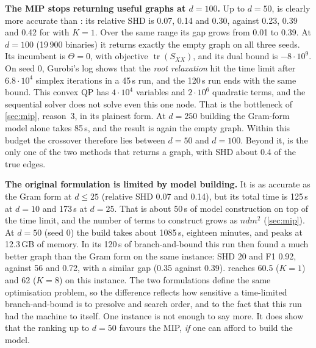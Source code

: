 \textbf{The MIP stops returning useful graphs at $d=100$.} Up to $d=50$, \exdbn{} is clearly
more accurate than \feddbn: its relative SHD is 0.07, 0.14 and 0.30, against 0.23, 0.39 and
0.42 for \feddbn{} with $K=1$. Over the same range its gap grows from 0.01 to 0.39. At
$d=100$ (19\,900 binaries) it returns exactly the empty graph on all three seeds. Its
incumbent is $\Theta=0$, with objective $\operatorname{tr}(S_{XX})$, and its dual bound is
$-8\cdot10^{9}$. On seed 0, Gurobi's log shows that the \emph{root relaxation} hit the time
limit after $6.8\cdot10^4$ simplex iterations in a 45\,s run, and the 120\,s run ends with the
same bound. This convex
QP has $4\cdot10^4$ variables and $2\cdot10^6$ quadratic terms, and the sequential solver
does not solve even this one node. That is the bottleneck of \cref{sec:mip}, reason~3, in its
plainest form. At $d=250$ building the Gram-form model alone takes 85\,s, and the result is
again the empty graph. Within this budget the crossover therefore lies between $d=50$ and
$d=100$. Beyond it, \feddbn{} is the only one of the two methods that returns a graph, with
SHD about 0.4 of the true edges.

\textbf{The original formulation is limited by model building.} It is as accurate as the
Gram form at $d\le 25$ (relative SHD 0.07 and 0.14), but its total time is 125\,s at $d=10$
and 173\,s at $d=25$. That is about 50\,s of model construction on top of the time limit, and the
number of terms to construct grows as $n d m^2$ (\cref{sec:mip}). At $d=50$ (seed 0) the
build takes about 1085\,s, eighteen minutes, and peaks at 12.3\,GB of memory. In its 120\,s
of branch-and-bound this run then found a much better graph than the Gram form on the same
instance: SHD 20 and F1 0.92, against 56 and 0.72, with a similar gap (0.35 against 0.39).
\feddbn{} reaches 60.5 ($K=1$) and 62 ($K=8$) on this instance. The two formulations define the
same optimisation problem, so the difference reflects how sensitive a time-limited
branch-and-bound is to presolve and search order, and to the fact that this run had the
machine to itself. One instance is not enough to say more. It does show that the ranking up
to $d=50$ favours the MIP, \emph{if} one can afford to build the model.
